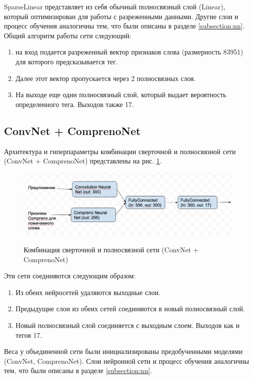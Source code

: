 SparseLinear представляет из себя обычный полносвязный слой (Linear), который
оптимизирован для работы с разреженными данными. Другие слои и процесс обучения
аналогичны тем, что были описаны в разделе \ref{subsection:nn}.
Общий алгоритм работы сети следующий:
\begin{enumerate}
  \item на вход подается разреженный вектор признаков слова (размерность 83951) для которого предсказывается тег.
  \item Далее этот вектор пропускается через 2 полносвязных слоя.
  \item На выходе еще один полносвязный слой, который выдает вероятность определенного тега.
  Выходов также 17.
\end{enumerate}

\subsection{ConvNet + ComprenoNet}

Архитектура и гиперпараметры комбинации сверточной и полносвязной сети (ConvNet + ComprenoNet)
представлены на рис. \ref{figure:two_net}.
\begin{figure}[!h]
  \centering
  \caption{Комбинация сверточной и полносвязной сети (ConvNet + ComprenoNet)}
  \includegraphics[scale=0.5]{figures/two-net.png}
  \label{figure:two_net}
\end{figure}
Эти сети соединяются следующим образом:
\begin{enumerate}
  \item Из обеих нейросетей удаляются выходные слои.
  \item Предыдущие слои из обеих сетей соединяются в новый полносвязный слой.
  \item Новый полносвязный слой соединяется с выходным слоем. Выходов как и тегов 17.
\end{enumerate}
Веса у объединенной сети были инициализированы предобученными моделями (ConvNet, ComprenoNet).
Слои нейронной сети и процесс обучения аналогичны тем, что были описаны в разделе \ref{subsection:nn}.

